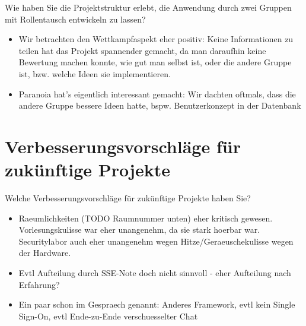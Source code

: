 \documentclass[12pt,DIV14,BCOR10mm,a4paper,parskip=half-,headsepline,headinclude,english,ngerman,bibliography=totocnumbered]{scrreprt}
\begin{document}
Wie haben Sie die Projektstruktur erlebt, die Anwendung durch zwei Gruppen mit Rollentausch entwickeln zu lassen?

\begin{itemize}
  \item Wir betrachten den Wettkampfaspekt eher positiv: Keine Informationen zu teilen hat das Projekt spannender gemacht, da man daraufhin keine Bewertung machen konnte, wie gut man selbst ist, oder die andere Gruppe ist, bzw. welche Ideen sie implementieren.
  \item Paranoia hat's eigentlich interessant gemacht: Wir dachten oftmals, dass die andere Gruppe bessere Ideen hatte, bspw. Benutzerkonzept in der Datenbank
\end{itemize}

\chapter{Verbesserungsvorschläge für zukünftige Projekte}

Welche Verbesserungsvorschläge für zukünftige Projekte haben Sie?

\begin{itemize}
  \item Raeumlichkeiten (TODO Raumnummer unten) eher kritisch gewesen. Vorlesungskulisse war eher unangenehm, da sie stark hoerbar war. Securitylabor auch eher unangenehm wegen Hitze/Geraeuschekulisse wegen der Hardware.
  \item Evtl Aufteilung durch SSE-Note doch nicht sinnvoll - eher Aufteilung nach Erfahrung?
  \item Ein paar schon im Gespraech genannt: Anderes Framework, evtl kein Single Sign-On, evtl Ende-zu-Ende verschuesselter Chat
\end{itemize}

\printbibliography

\printacronyms[title=Abkürzungsverzeichnis,toctitle=Abkürzungsverzeichnis]
\printglossary[title=Glossar,toctitle=Glossar,type=main]

\iftotalfigures
  \listoffigures
\fi


\begin{appendices}

\end{appendices}
\end{document}
